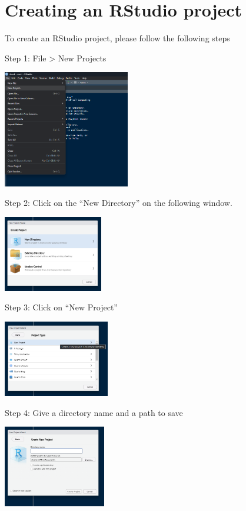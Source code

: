 \documentclass[
  letterpaper,
  DIV=11,
  numbers=noendperiod]{scrreprt}
\begin{document}
\hypertarget{creating-an-rstudio-project}{%
\section{Creating an RStudio
project}\label{creating-an-rstudio-project}}

To create an RStudio project, please follow the following steps

Step 1: File \textgreater{} New Projects

\includegraphics[width=2.18in,height=\textheight]{img/chap1/rw8.png}

Step 2: Click on the ``New Directory'' on the following window.

\includegraphics[width=1.71in,height=\textheight]{img/chap1/rw9.png}

Step 3: Click on ``New Project''

\includegraphics[width=1.82in,height=\textheight]{img/chap1/rw10.png}

Step 4: Give a directory name and a path to save

\includegraphics[width=1.76in,height=\textheight]{img/chap1/rw11.png}
\end{document}
